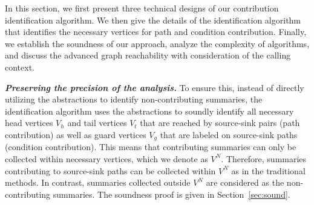 



In this section, we first present three technical designs of our contribution identification algorithm.
We then give the details of the identification algorithm that identifies the necessary vertices for path and condition contribution.
Finally, we establish the soundness of our approach, analyze the complexity of algorithms, and discuss the advanced graph reachability with consideration of the calling context.

\textit{\textbf{Preserving the precision of the analysis.}} To ensure this, instead of directly utilizing the abstractions to identify non-contributing summaries,
    the identification algorithm uses the abstractions to soundly identify all necessary head vertices $V_{h}$ and tail vertices $V_{t}$ that are reached by source-sink pairs (path contribution) as well as guard vertices $V_{g}$ that are labeled on source-sink paths (condition contribution).
    This means that contributing summaries can only be collected within necessary vertices, which we denote as $V^{N}$.
    Therefore, summaries contributing to source-sink paths can be collected within $V^{N}$ as in the traditional methods.
    In contrast, summaries collected outside $V^{N}$ are considered as the non-contributing summaries.
    The soundness proof is given in Section~\ref{sec:sound}.


